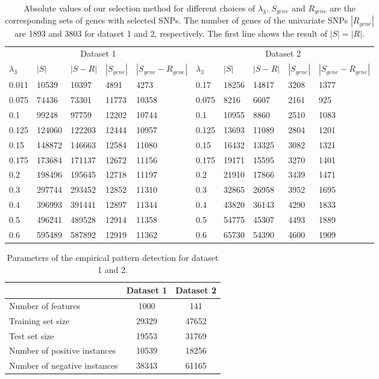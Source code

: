 \documentclass{article}
\begin{document}
\begin{table}[h]
 \caption{Absolute values of our selection method for different choices of $\lambda_{3}$. $S_{gene}$ and $R_{gene}$ are the corresponding sets of genes with selected SNPs. The number of genes of the univariate SNPs $|R_{gene}|$ are 1893 and 3803 for dataset 1 and 2, respectively. The first line shows the result of $|S|=|R|$.}
  \centering
  \begin{tabular}{lllll|lllll}
    \toprule
    \multicolumn{5}{c|}{Dataset 1}& \multicolumn{5}{c}{Dataset 2} \\
    $\lambda_{3}$&$|S|$&$|S-R|$&$|S_{gene}|$&$|S_{gene}-R_{gene}|$&$\lambda_{3}$&$|S|$&$|S-R|$&$|S_{gene}|$&$|S_{gene}-R_{gene}|$\\
    \midrule
    0.011&10539&10397&4891&4273&0.17&18256&14817&3208&1377\\ 
    0.075&74436&73301&11773&10358&0.075&8216&6607&2161&925\\ 
    0.1&99248&97759&12202&10744&0.1&10955&8860&2510&1083\\ 
    0.125&124060&122203&12444&10957&0.125&13693&11089&2804&1201\\ 
    0.15&148872&146663&12584&11080&0.15&16432&13325&3082&1321\\ 
    0.175&173684&171137&12672&11156&0.175&19171&15595&3270&1401\\ 
    0.2&198496&195645&12718&11197&0.2&21910&17866&3439&1471\\
    0.3&297744&293452&12852&11310&0.3&32865&26958&3952&1695\\ 
    0.4&396993&391441&12897&11344&0.4&43820&36143&4290&1833\\ 
    0.5&496241&489528&12914&11358&0.5&54775&45307&4493&1889\\ 
    0.6&595489&587892&12919&11362&0.6&65730&54390&4600&1909\\
    \bottomrule
  \end{tabular}
  \label{tab:absolute_values}
\end{table}

\begin{table}[h]
 \caption{Parameters of the empirical pattern detection for dataset 1 and 2.}
  \centering
  \begin{tabular}{lc|c}
    \toprule
    &Dataset 1&Dataset 2 \\
    \midrule
    Number of features&1000&141\\
    Training set size&29329&47652\\
    Test set size&19553&31769\\
    Number of positive instances&10539&18256\\
    Number of negative instances&38343&61165\\
    \bottomrule
  \end{tabular}
  \label{tab:basic_statistis}
\end{table}
\end{document}
